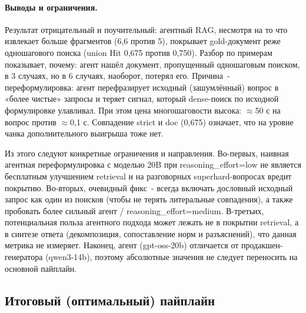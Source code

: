\documentclass[a4paper,12pt]{article}
\begin{document}
\paragraph{Выводы и ограничения.} Результат отрицательный и поучительный: агентный RAG, несмотря на то что извлекает больше фрагментов (6,6 против 5), покрывает gold-документ реже одношагового поиска (union Hit 0,675 против 0,750). Разбор по примерам показывает, почему: агент нашёл документ, пропущенный одношаговым поиском, в 3 случаях, но в 6 случаях, наоборот, потерял его. Причина~- переформулировка: агент перефразирует исходный (зашумлённый) вопрос в «более чистые» запросы и теряет сигнал, который dense-поиск по исходной формулировке улавливал. При этом цена многошаговости высока: $\approx$50 с на вопрос против $\approx$0,1 с. Совпадение strict и doc (0,675) означает, что на уровне чанка дополнительного выигрыша тоже нет.

Из этого следуют конкретные ограничения и направления. Во-первых, наивная агентная переформулировка с моделью 20B при reasoning\_effort=low не является бесплатным улучшением retrieval и на разговорных superhard-вопросах вредит покрытию. Во-вторых, очевидный фикс~- всегда включать дословный исходный запрос как один из поисков (чтобы не терять литеральные совпадения), а также пробовать более сильный агент / reasoning\_effort=medium. В-третьих, потенциальная польза агентного подхода может лежать не в покрытии retrieval, а в синтезе ответа (декомпозиция, сопоставление норм и разъяснений), что данная метрика не измеряет. Наконец, агент (gpt-oss-20b) отличается от продакшен-генератора (qwen3-14b), поэтому абсолютные значения не следует переносить на основной пайплайн.

\subsection{Итоговый (оптимальный) пайплайн}
\label{sec:optimal}
\end{document}
